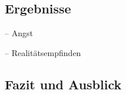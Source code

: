 \subsection{Ergebnisse}

\begin{frame}{\currentname{} -- Angst}

\end{frame}

\begin{frame}{\currentname{} -- Realitätsempfinden}

\end{frame}

\subsection{Fazit und Ausblick}


